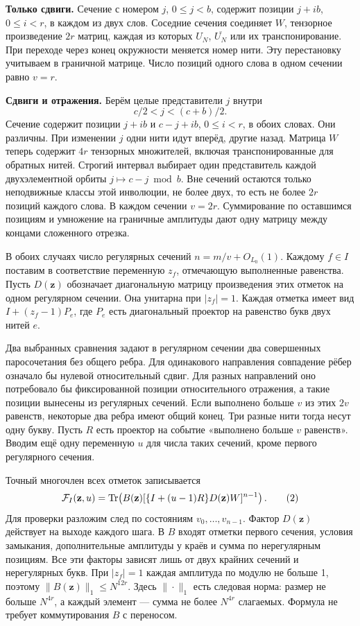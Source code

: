 \documentclass[11pt,a4paper]{article}
\newcommand{\Tr}{\operatorname{Tr}}
\newcommand{\subt}[1]{\par\medskip\noindent\textbf{#1.}\quad}
\begin{document}
\subt{Только сдвиги}
Сечение с номером \(j\), \(0\le j<b\), содержит позиции \(j+ib\), \(0\le i<r\), в каждом из двух слов. Соседние сечения соединяет \(W\), тензорное произведение \(2r\) матриц, каждая из которых \(U_N\), \(\overline{U_N}\) или их транспонирование. При переходе через конец окружности меняется номер нити. Эту перестановку учитываем в граничной матрице. Число позиций одного слова в одном сечении равно \(v=r\).

\subt{Сдвиги и отражения}
Берём целые представители \(j\) внутри
\[
                         c/2< j <(c+b)/2 .
\]
Сечение содержит позиции \(j+ib\) и \(c-j+ib\), \(0\le i<r\), в обоих словах. Они различны. При изменении \(j\) одни нити идут вперёд, другие назад. Матрица \(W\) теперь содержит \(4r\) тензорных множителей, включая транспонированные для обратных нитей. Строгий интервал выбирает один представитель каждой двухэлементной орбиты \(j\mapsto c-j\bmod b\). Вне сечений остаются только неподвижные классы этой инволюции, не более двух, то есть не более \(2r\) позиций каждого слова. В каждом сечении \(v=2r\). Суммирование по оставшимся позициям и умножение на граничные амплитуды дают одну матрицу между концами сложенного отрезка.

В обоих случаях число регулярных сечений \(n=m/v+O_{L_0}(1)\).
Каждому \(f\in I\) поставим в соответствие переменную \(z_f\), отмечающую выполненные равенства. Пусть \(D(\mathbf z)\) обозначает диагональную матрицу произведения этих отметок на одном регулярном сечении. Она унитарна при \(|z_f|=1\). Каждая отметка имеет вид \(I+(z_f-1)P_e\), где \(P_e\) есть диагональный проектор на равенство букв двух нитей \(e\).

Два выбранных сравнения задают в регулярном сечении два совершенных паросочетания без общего ребра. Для одинакового направления совпадение рёбер означало бы нулевой относительный сдвиг. Для разных направлений оно потребовало бы фиксированной позиции относительного отражения, а такие позиции вынесены из регулярных сечений. Если выполнено больше \(v\) из этих \(2v\) равенств, некоторые два ребра имеют общий конец. Три разные нити тогда несут одну букву. Пусть \(R\) есть проектор на событие «выполнено больше \(v\) равенств». Вводим ещё одну переменную \(u\) для числа таких сечений, кроме первого регулярного сечения.

Точный многочлен всех отметок записывается
\[
       {\cal F}_I(\mathbf z,u)
           =\Tr\!\left(B(\mathbf z)
             [\{I+(u-1)R\}D(\mathbf z) W]^{n-1}\right).        \tag{2}
\]
Для проверки разложим след по состояниям \(v_0,\ldots,v_{n-1}\). Фактор
\(D(\mathbf z)\) действует на выходе каждого шага. В \(B\) входят отметки первого сечения, условия замыкания, дополнительные амплитуды у краёв и сумма по нерегулярным позициям. Все эти факторы зависят лишь от двух крайних сечений и нерегулярных букв. При \(|z_f|=1\) каждая амплитуда по модулю не больше 1, поэтому
\(\|B(\mathbf z)\|_1\le N^{12r}\).
Здесь \(\|\cdot\|_1\) есть следовая норма: размер не больше \(N^{4r}\), а каждый элемент — сумма не более \(N^{4r}\) слагаемых. Формула не требует коммутирования \(B\) с переносом.
\end{document}
